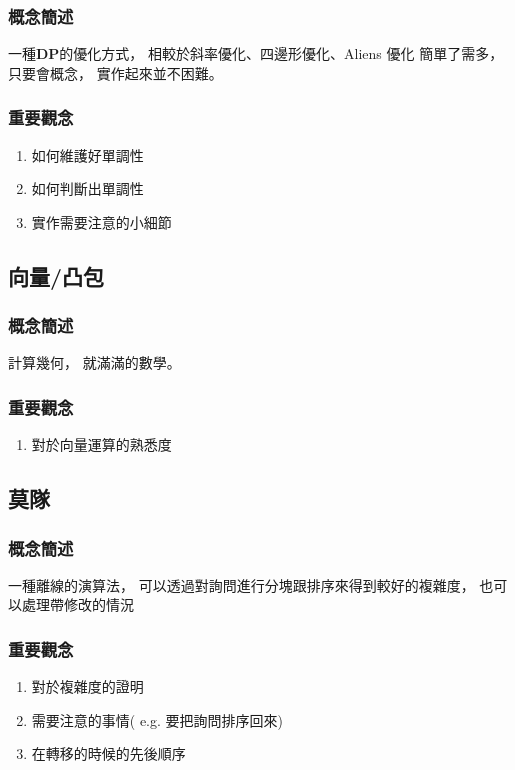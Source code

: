 \documentclass[12pt,oneside]{article}
\begin{document}
\subsubsection*{概念簡述}
一種\textbf{DP}的優化方式，
相較於斜率優化、四邊形優化、Aliens 優化 簡單了需多，
只要會概念，
實作起來並不困難。

\subsubsection*{重要觀念}
\begin{adjustwidth}{2em}{0em}
\begin{enumerate}
    \item 
        如何維護好單調性
    \item 
        如何判斷出單調性
    \item 
        實作需要注意的小細節
\end{enumerate}
\end{adjustwidth}
\clearpage


\subsection{向量/凸包}
\subsubsection*{概念簡述}

計算幾何，
就滿滿的數學。

\subsubsection*{重要觀念}
\begin{adjustwidth}{2em}{0em}
\begin{enumerate}
    \item 
        對於向量運算的熟悉度
\end{enumerate}
\end{adjustwidth}
\clearpage


\subsection{莫隊}
\subsubsection*{概念簡述}
一種離線的演算法，
可以透過對詢問進行分塊跟排序來得到較好的複雜度，
也可以處理帶修改的情況
\subsubsection*{重要觀念}
\begin{adjustwidth}{2em}{0em}
\begin{enumerate}
    \item
        對於複雜度的證明
    \item
        需要注意的事情( e.g. 要把詢問排序回來)
    \item 
        在轉移的時候的先後順序
\end{enumerate}
\end{adjustwidth}
\clearpage
\end{document}
